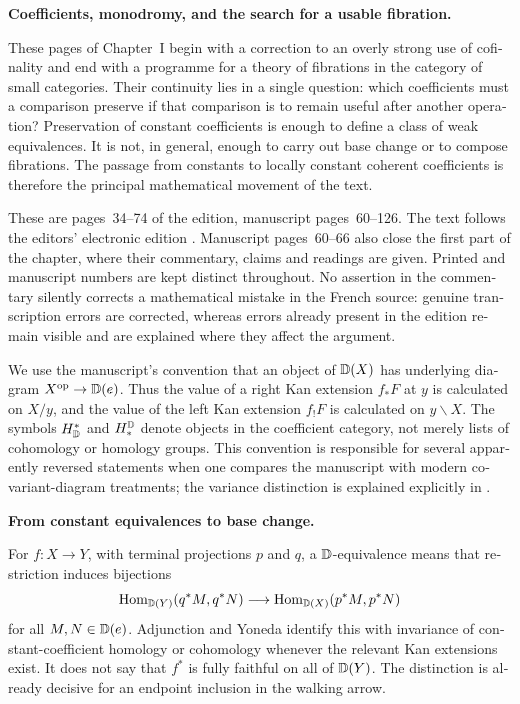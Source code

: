 \begin{otherlanguage}{english}
\begin{otherlanguage}{english}
\noindent\textbf{Coefficients, monodromy, and the search for a usable fibration.}

These pages of Chapter~I begin with a correction to an overly strong use of cofinality and end with a programme for a theory of fibrations in the category of small categories. Their continuity lies in a single question: which coefficients must a comparison preserve if that comparison is to remain useful after another operation? Preservation of constant coefficients is enough to define a class of weak equivalences. It is not, in general, enough to carry out base change or to compose fibrations. The passage from constants to locally constant coherent coefficients is therefore the principal mathematical movement of the text.

These are pages~34--74 of the edition, manuscript pages~60--126. The text follows the editors' electronic edition \citep{Grothendieck1990Derivateurs}. Manuscript pages~60--66 also close the first part of the chapter, where their commentary, claims and readings are given. Printed and manuscript numbers are kept distinct throughout. No assertion in the commentary silently corrects a mathematical mistake in the French source: genuine transcription errors are corrected, whereas errors already present in the edition remain visible and are explained where they affect the argument.

We use the manuscript's convention that an object of $\mathbb{D}(X)$ has underlying diagram $X^{\mathrm{op}}\to\mathbb{D}(e)$. Thus the value of a right Kan extension $f_*F$ at $y$ is calculated on $X/y$, and the value of the left Kan extension $f_!F$ is calculated on $y\backslash X$. The symbols $H^*_{\mathbb{D}}$ and $H_*^{\mathbb{D}}$ denote objects in the coefficient category, not merely lists of cohomology or homology groups. This convention is responsible for several apparently reversed statements when one compares the manuscript with modern covariant-diagram treatments; the variance distinction is explained explicitly in \citet[Warning~2.2]{GrothPontoShulman2014}.

\medskip\noindent\textbf{From constant equivalences to base change.}

For $f:X\to Y$, with terminal projections $p$ and $q$, a $\mathbb{D}$-equivalence means that restriction induces bijections
\[
 \operatorname{Hom}_{\mathbb{D}(Y)}(q^*M,q^*N)
 \longrightarrow
 \operatorname{Hom}_{\mathbb{D}(X)}(p^*M,p^*N)
\]
for all $M,N\in\mathbb{D}(e)$. Adjunction and Yoneda identify this with invariance of constant-coefficient homology or cohomology whenever the relevant Kan extensions exist. It does not say that $f^*$ is fully faithful on all of $\mathbb{D}(Y)$. The distinction is already decisive for an endpoint inclusion in the walking arrow.


\end{otherlanguage}
\end{otherlanguage}
